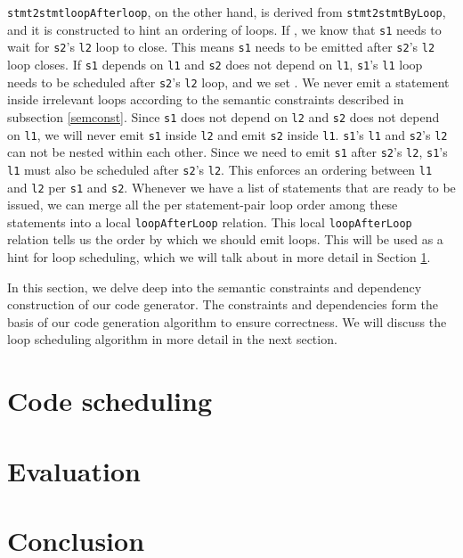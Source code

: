 \documentclass[sigplan, nonacm]{acmart}\settopmatter{printfolios=true,printccs=false,printacmref=false}
\begin{document}
\fi
\texttt{stmt2stmtloopAfterloop}, on the other hand, is derived from \texttt{stmt2stmtByLoop}, and it is constructed to hint an ordering of loops. If , we know that \texttt{s1} needs to wait for \texttt{s2}'s \texttt{l2} loop to close. This means \texttt{s1} needs to be emitted after \texttt{s2}'s \texttt{l2} loop closes. If \texttt{s1} depends on \texttt{l1} and \texttt{s2} does not depend on \texttt{l1}, \texttt{s1}'s \texttt{l1} loop needs to be scheduled after \texttt{s2}'s \texttt{l2} loop, and we set . We never emit a statement inside irrelevant loops according to the semantic constraints described in subsection \ref{semconst}. Since \texttt{s1} does not depend on \texttt{l2} and \texttt{s2} does not depend on \texttt{l1}, we will never emit \texttt{s1} inside \texttt{l2} and emit \texttt{s2} inside \texttt{l1}. \texttt{s1}'s \texttt{l1} and \texttt{s2}'s \texttt{l2} can not be nested within each other. Since we need to emit \texttt{s1} after \texttt{s2}'s \texttt{l2}, \texttt{s1}'s \texttt{l1} must also be scheduled after \texttt{s2}'s \texttt{l2}. This enforces an ordering between \texttt{l1} and \texttt{l2} per \texttt{s1} and \texttt{s2}. Whenever we have a list of statements that are ready to be issued, we can merge all the per statement-pair loop order among these statements into a local \texttt{loopAfterLoop} relation. This local \texttt{loopAfterLoop} relation tells us the order by which we should emit loops. This will be used as a hint for loop scheduling, which we will talk about in more detail in Section \ref{codeschedule}.\par
In this section, we delve deep into the semantic constraints and dependency construction of our code generator. The constraints and dependencies form the basis of our code generation algorithm to ensure correctness. We will discuss the loop scheduling algorithm in more detail in the next section.
\section{Code scheduling}\label{codeschedule}
\section{Evaluation}\label{evaluation}
\section{Conclusion}\label{conclusion}


\end{document}
